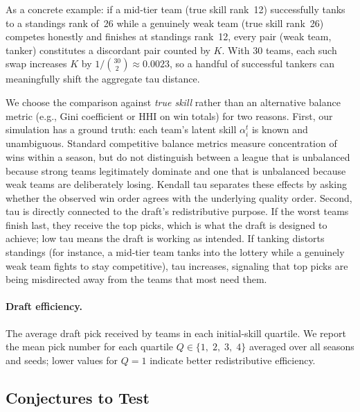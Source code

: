 \documentclass{article}
\begin{document}
As a concrete example: if a mid-tier team (true skill rank~12) successfully
tanks to a standings rank of~26 while a genuinely weak team (true skill
rank~26) competes honestly and finishes at standings rank~12, every pair
(weak team, tanker) constitutes a discordant pair counted by $K$.
With 30 teams, each such swap increases $K$ by $1/\binom{30}{2} \approx
0.0023$, so a handful of successful tankers can meaningfully shift the
aggregate tau distance.

We choose the comparison against \emph{true skill} rather than an alternative
balance metric (e.g., Gini coefficient or HHI on win totals) for two reasons.
First, our simulation has a ground truth: each team's latent skill
$\alpha_i^t$ is known and unambiguous.
Standard competitive balance metrics measure concentration of wins within a
season, but do not distinguish between a league that is unbalanced because
strong teams legitimately dominate and one that is unbalanced because weak
teams are deliberately losing.
Kendall tau separates these effects by asking whether the observed win order
agrees with the underlying quality order.
Second, tau is directly connected to the draft's redistributive purpose.
If the worst teams finish last, they receive the top picks, which is what
the draft is designed to achieve; low tau means the draft is working as
intended.
If tanking distorts standings (for instance, a mid-tier team tanks into
the lottery while a genuinely weak team fights to stay competitive), tau
increases, signaling that top picks are being misdirected away from the teams
that most need them.

\paragraph{Draft efficiency.}
The average draft pick received by teams in each initial-skill quartile.
We report the mean pick number for each quartile
$Q \in \{1,\; 2,\; 3,\; 4\}$ averaged over all seasons and seeds; lower
values for $Q = 1$ indicate better redistributive efficiency.

\subsection{Conjectures to Test}
\end{document}
